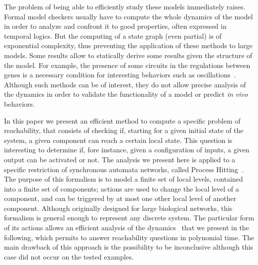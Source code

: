 \documentclass{movep}
\newcounter{la}
\newcommand{\ie}{i.e.\ }
\begin{document}
The problem of being able to efficiently study these models immediately raises.
Formal model checkers usually have to compute the whole dynamics of the model
in order to analyze and confront it to good properties,
often expressed in temporal logics. %
But the computing of a state graph (even partial) is of exponential complexity,
thus preventing the application of these methods to large models.
Some results allow to statically derive some results given the structure of the model.
For example, the presence of some circuits in the regulations between genes
is a necessary condition for interesting behaviors such as oscillations~\cite{RiCo07}.
Although such methods can be of interest, they do not allow precise analysis of the dynamics
in order to validate the functionality of a model or predict \textit{in vivo} behaviors.

In this paper we present an efficient method to compute a specific problem of reachability,
that consists of checking if,
starting for a given initial state of the system,
a given component can reach a certain local state.
This question is interesting to determine if, fore instance, given a configuration of inputs,
a given output can be activated or not.
The analysis we present here is applied to a specific restriction of synchronous automata networks,
called Process Hitting~\cite{PMR10-TCSB}.
The purpose of this formalism is to model a finite set of local levels,
contained into a finite set of components;
actions are used to change the local level of a component, and can be triggered by
at most one other local level of another component.
Although originally designed for large biological networks,
this formalism is general enough to represent any discrete system.
The particular form of its actions allows an efficient analysis of the
dynamics~\cite{PMR12-MSCS,FPMR13-CS2Bio}
that we present in the following,
which permits to answer reachability questions in polynomial time.
The main drawback of this approach is the possibility to be inconclusive
although this case did not occur on the tested examples.
\end{document}
